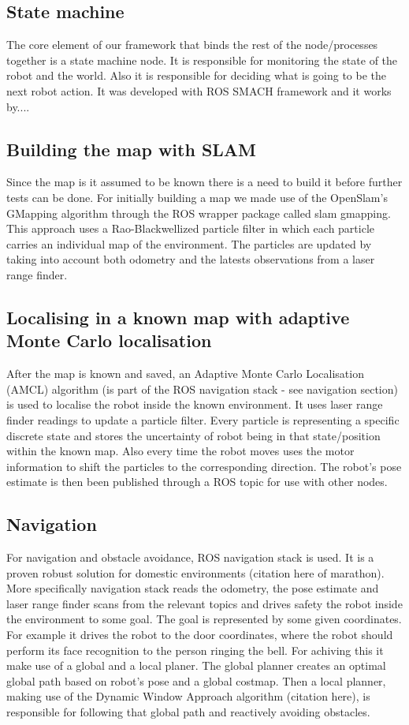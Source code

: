 \documentclass[conference]{IEEEtran}
\begin{document}
\subsection{State machine}
The core element of our framework that binds the rest of the node/processes together is a state machine node. It is responsible for monitoring the state of the robot and the world. Also it is responsible for deciding what is going to be the next robot action. It was developed with ROS SMACH framework and it works by....

\subsection{Building the map with SLAM}
Since the map is it assumed to be known there is a need to build it before further tests can be done. For initially building a map we made use of the OpenSlam's GMapping algorithm \cite{slam} through the ROS wrapper package called slam gmapping. This approach uses a Rao-Blackwellized particle filter in which each particle carries an individual map of the environment.  The particles are updated by taking into account both odometry and the latests observations from a laser range finder.

\subsection{Localising in a known map with adaptive Monte Carlo localisation}
After the map is known and saved, an Adaptive Monte Carlo Localisation (AMCL)\cite{amcl} algorithm (is part of the ROS navigation stack - see navigation section) is used to localise the robot inside the known environment. It uses laser range finder readings to update a particle filter. Every particle is representing a specific discrete state and stores the uncertainty of robot being in that state/position within the known map. Also every time the robot moves uses the motor information to shift the particles to the corresponding direction. The robot's pose estimate is then been published through a ROS topic for use with other nodes.

\subsection{Navigation}
For navigation and obstacle avoidance, ROS navigation stack is used. It is a proven robust solution for domestic environments (citation here of marathon). More specifically navigation stack reads the odometry, the pose estimate and laser range finder scans from the relevant topics and drives safety the robot inside the environment to some goal. The goal is represented by some given coordinates. For example it drives the robot to the door coordinates, where the robot should perform its face recognition to the person ringing the bell. For achiving this it make use of a global and a local planer. The global planner creates an optimal global path based on robot's pose and a global costmap. Then a local planner, making use of the Dynamic Window Approach algorithm (citation here), is responsible for following that global path and reactively avoiding obstacles.
\end{document}
